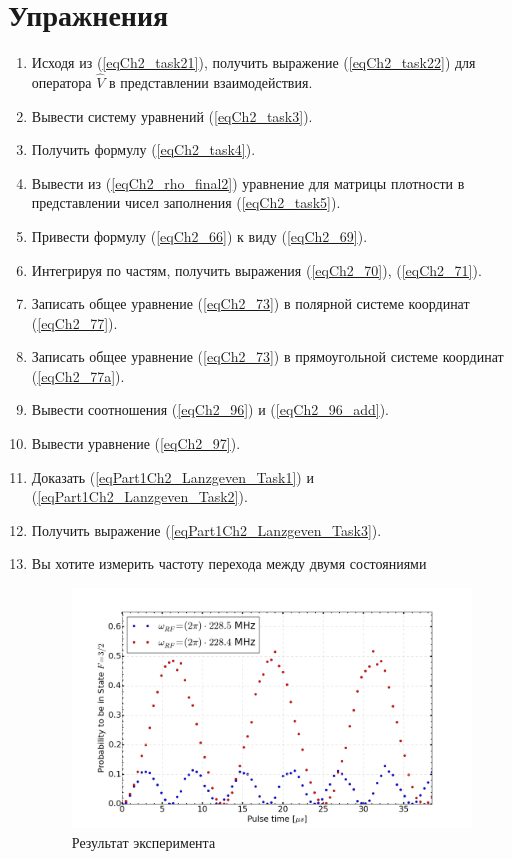 \section{Упражнения}
\begin{enumerate}
\item Исходя из (\ref{eqCh2_task21}), получить выражение
  (\ref{eqCh2_task22}) для оператора $\hat{V}$ в представлении
  взаимодействия. 
\item Вывести систему уравнений (\ref{eqCh2_task3}).
\item Получить формулу (\ref{eqCh2_task4}).
\item Вывести из (\ref{eqCh2_rho_final2}) уравнение для матрицы
  плотности в представлении чисел заполнения (\ref{eqCh2_task5}). 
\item Привести формулу (\ref{eqCh2_66}) к виду (\ref{eqCh2_69}).
\item Интегрируя по частям, получить выражения (\ref{eqCh2_70}),
  (\ref{eqCh2_71}).
\item Записать общее уравнение (\ref{eqCh2_73}) в полярной системе
  координат (\ref{eqCh2_77}). 
\item Записать общее уравнение (\ref{eqCh2_73}) в прямоугольной
  системе координат (\ref{eqCh2_77a}). 
\item Вывести соотношения (\ref{eqCh2_96}) и (\ref{eqCh2_96_add}).
\item Вывести уравнение (\ref{eqCh2_97}).
\item Доказать (\ref{eqPart1Ch2_Lanzgeven_Task1}) и (\ref{eqPart1Ch2_Lanzgeven_Task2}).
\item Получить выражение (\ref{eqPart1Ch2_Lanzgeven_Task3}).
\item Вы хотите измерить частоту перехода между двумя состояниями
  \begin{figure}
    \centering
    \includegraphics[scale=0.4]{part1/interaction/RabiOscillations2_v3.png}
    \caption{Результат эксперимента}
    \end{figure}
\end{enumerate}
